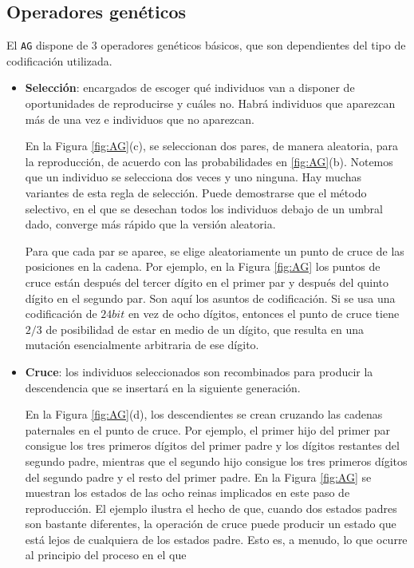 	\subsection{Operadores genéticos}
	\par El \texttt{AG} dispone de 3 operadores genéticos básicos, que son dependientes del tipo de codificación utilizada.
	\begin{itemize}
		\item \textbf{Selección}: encargados de escoger qué individuos van a disponer de oportunidades de reproducirse y cuáles no. Habrá
		individuos que aparezcan más de una vez e individuos que no aparezcan.
		\par En la Figura \ref{fig:AG}(c), se seleccionan dos pares, de manera aleatoria, para la reproducción, de acuerdo con las probabilidades en \ref{fig:AG}(b). 
		Notemos que un individuo se selecciona dos veces y uno ninguna. Hay muchas variantes de esta regla de selección. Puede demostrarse que el método selectivo, 
		en el que se desechan todos los individuos debajo de un umbral dado, converge más rápido que la versión aleatoria.
		\par Para que cada par se aparee, se elige aleatoriamente un punto de cruce de las posiciones en la cadena. 
		Por ejemplo, en la Figura \ref{fig:AG} los puntos de cruce están después del tercer dígito en el primer par y 
		después del quinto dígito en el segundo par. Son aquí los asuntos de codificación. Si se usa una codificación de $24 bit$ en vez de ocho dígitos, 
		entonces el punto de cruce tiene $2/3$ de posibilidad de estar en medio de un dígito, que resulta en una mutación esencialmente 
		arbitraria de ese dígito.
		\item \textbf{Cruce}: los individuos seleccionados son recombinados para producir la descendencia que se insertará en la siguiente generación.
		\par En la Figura \ref{fig:AG}(d), los descendientes se crean cruzando las cadenas paternales en el punto de cruce.
		Por ejemplo, el primer hijo del primer par consigue los tres primeros dígitos del primer padre y los dígitos restantes del segundo 
		padre, mientras que el segundo hijo consigue los tres primeros dígitos del segundo padre y el resto del primer padre. 
		En la Figura \ref{fig:AG} se muestran los estados de las ocho reinas implicados en este paso de reproducción. 
		El ejemplo ilustra el hecho de que, cuando dos estados padres son bastante diferentes, la operación de cruce puede producir 
		un estado que está lejos de cualquiera de los estados padre. Esto es, a menudo, lo que ocurre al principio del proceso en el que 

\end{itemize}
